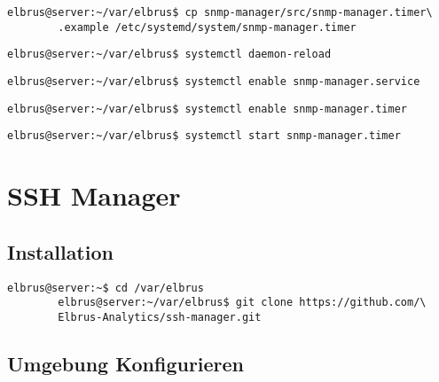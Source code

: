 \documentclass{article}
\begin{document}
	\begin{lstlisting}[caption={Kopieren des Zeitplanungsprogrammes.}]
		elbrus@server:~/var/elbrus$ cp snmp-manager/src/snmp-manager.timer\
		.example /etc/systemd/system/snmp-manager.timer
	\end{lstlisting}
	
	\begin{lstlisting}[caption={Neuladen des 'systemctl' Deamons.}]
		elbrus@server:~/var/elbrus$ systemctl daemon-reload
	\end{lstlisting}
	
	\begin{lstlisting}[caption={Aktivieren des Serviceprogrammes.}]
		elbrus@server:~/var/elbrus$ systemctl enable snmp-manager.service
	\end{lstlisting}
	
	\begin{lstlisting}[caption={Aktivieren des Zeitplanungsprogrammes.}]
		elbrus@server:~/var/elbrus$ systemctl enable snmp-manager.timer
	\end{lstlisting}
	
	\begin{lstlisting}[caption={Starten des Zeitplanungsprogrammes.}]
		elbrus@server:~/var/elbrus$ systemctl start snmp-manager.timer
	\end{lstlisting}
	\newpage
	
	\section{SSH Manager}
	\subsection{Installation}
	\begin{lstlisting}[caption={Clonen der Software von GitHub.}]
		elbrus@server:~$ cd /var/elbrus
		elbrus@server:~/var/elbrus$ git clone https://github.com/\
		Elbrus-Analytics/ssh-manager.git
	\end{lstlisting}

	\subsection[file config]{Umgebung Konfigurieren}
	\lstset{style=files}
\end{document}

